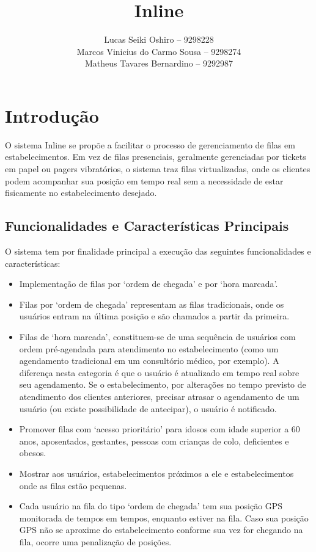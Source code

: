 \documentclass{book}
\title{Inline}
\author{Lucas Seiki Oshiro -- 9298228\\
  Marcos Vinicius do Carmo Sousa -- 9298274\\
  Matheus Tavares Bernardino -- 9292987\\}
\begin{document}
\maketitle
\tableofcontents

\chapter{Introdução}
O sistema Inline se propõe a facilitar o processo de gerenciamento de filas em
estabelecimentos. Em vez de filas presenciais, geralmente gerenciadas por
tickets em papel ou pagers vibratórios, o sistema traz filas virtualizadas, onde
os clientes podem acompanhar sua posição em tempo real sem a necessidade de
estar fisicamente no estabelecimento desejado.

\section{Funcionalidades e Características Principais}
O sistema tem por finalidade principal a execução das seguintes funcionalidades
e características:

\begin{itemize}
\item Implementação de filas por ‘ordem de chegada’ e por ‘hora marcada’.
\item Filas por ‘ordem de chegada’ representam as filas tradicionais, onde os
  usuários entram na última posição e são chamados a partir da primeira. 
\item Filas de ‘hora marcada’, constituem-se de uma sequência de usuários com
  ordem pré-agendada para atendimento no estabelecimento (como um agendamento
  tradicional em um consultório médico, por exemplo). A diferença nesta
  categoria é que o usuário é atualizado em tempo real sobre seu agendamento. Se
  o estabelecimento, por alterações no tempo previsto de atendimento dos
  clientes anteriores, precisar atrasar o agendamento de um usuário (ou existe
  possibilidade de antecipar), o usuário é notificado.
\item Promover filas com ‘acesso prioritário’ para idosos com idade superior a
  60 anos, aposentados, gestantes, pessoas com crianças de colo, deficientes e
  obesos.
\item Mostrar aos usuários, estabelecimentos próximos a ele e estabelecimentos
  onde as filas estão pequenas.
\item Cada usuário na fila do tipo ‘ordem de chegada’ tem sua posição GPS
  monitorada de tempos em tempos, enquanto estiver na fila. Caso sua posição GPS
  não se aproxime do estabelecimento conforme sua vez for chegando na fila,
  ocorre uma penalização de posições.
\end{itemize}
\end{document}
